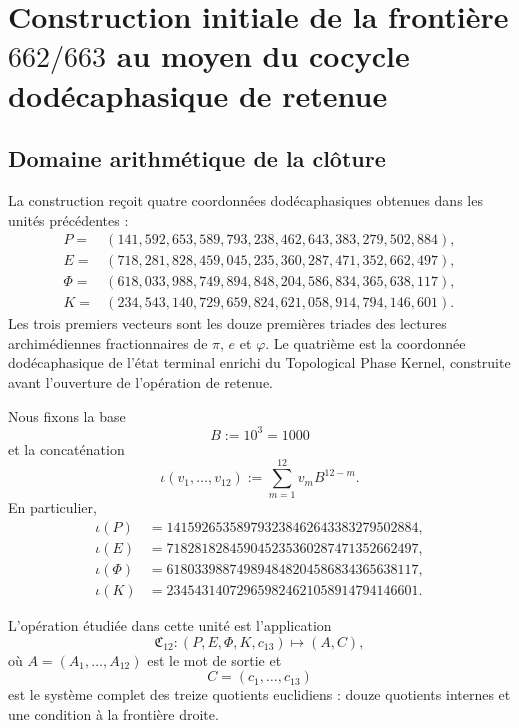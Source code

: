 
\section{Construction initiale de la frontière \texorpdfstring{\(662/663\)}{662/663} au moyen du cocycle dodécaphasique de retenue}
\label{p12-83-c10-s2:chap:acarreo-alpha-frontera-662-663}

\subsection{Domaine arithmétique de la clôture}

La construction reçoit quatre coordonnées dodécaphasiques obtenues dans les
unités précédentes :
\[
\begin{aligned}
 P={}&(141,592,653,589,793,238,462,643,383,279,502,884),\\
 E={}&(718,281,828,459,045,235,360,287,471,352,662,497),\\
 \Phi={}&(618,033,988,749,894,848,204,586,834,365,638,117),\\
 K={}&(234,543,140,729,659,824,621,058,914,794,146,601).
\end{aligned}
\]
Les trois premiers vecteurs sont les douze premières triades des lectures
archimédiennes fractionnaires de \(\pi\), \(e\) et \(\varphi\). Le quatrième est
la coordonnée dodécaphasique de l’état terminal enrichi du Topological
Phase Kernel, construite avant l’ouverture de l’opération de retenue.

Nous fixons la base
\[
 B:=10^3=1000
\]
et la concaténation
\begin{equation}
 \iota(v_1,\ldots,v_{12})
 :=\sum_{m=1}^{12}v_mB^{12-m}.
 \label{p12-83-c10-s2:eq:concatenacion-base-mil-alpha}
\end{equation}
En particulier,
\[
\begin{aligned}
 \iota(P)&=141592653589793238462643383279502884,\\
 \iota(E)&=718281828459045235360287471352662497,\\
 \iota(\Phi)&=618033988749894848204586834365638117,\\
 \iota(K)&=234543140729659824621058914794146601.
\end{aligned}
\]

L’opération étudiée dans cette unité est l’application
\begin{equation}
 \mathfrak C_{12}:
 (P,E,\Phi,K,c_{13})
 \longmapsto(A,C),
 \label{p12-83-c10-s2:eq:mapa-cierre-dodecafasico-alpha}
\end{equation}
où \(A=(A_1,\ldots,A_{12})\) est le mot de sortie et
\[
 C=(c_1,\ldots,c_{13})
\]
est le système complet des treize quotients euclidiens : douze quotients
internes et une condition à la frontière droite.

